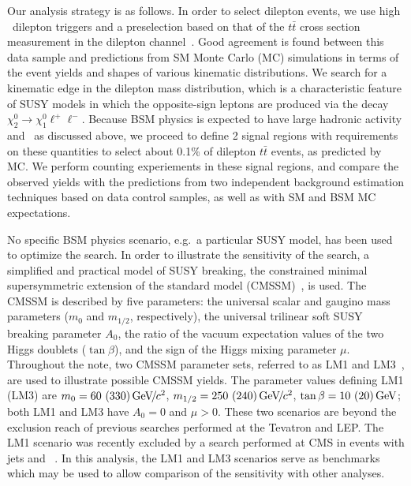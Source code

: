 Our analysis strategy is as follows. In order to select dilepton events, we
use high \pt\ dilepton triggers and a preselection based 
on that of the $t\bar{t}$ cross section measurement in the dilepton channel~\cite{ref:top}.
Good agreement is found between this
data sample and predictions from SM Monte Carlo (MC) simulations in terms of the event yields
and shapes of various kinematic distributions. 
We search for a kinematic edge in the dilepton mass distribution, which is a characteristic
feature of SUSY models in which the opposite-sign leptons are produced via the decay 
$\chi_2^0 \to \chi_1^0 \ell^+\ell^-$.
Because BSM physics is expected to have large hadronic activity and \MET\ as discussed
above, we  proceed to define 2 signal regions
with requirements on these quantities to select about 0.1\% 
of dilepton $t\bar{t}$ events, as predicted by MC.
We perform counting experiements in these signal regions, and compare the observed yields
with the predictions from two 
independent background estimation techniques based on data control samples, 
as well as with SM and BSM MC expectations.

No specific BSM physics scenario, e.g.\ a particular SUSY model, has been used to optimize the search.
In order to illustrate the sensitivity of the search, a simplified and practical model of 
SUSY breaking, the constrained minimal supersymmetric
extension of the standard model (CMSSM)~\cite{CMSSM,CMSSM2}, is used. The CMSSM is described by
five parameters: the universal scalar and gaugino mass parameters ($m_0$ and $m_{1/2}$, respectively),
the universal trilinear soft SUSY breaking parameter $A_0$, the
ratio of the vacuum expectation values of the two Higgs doublets ($\tan\beta$), and the sign of the
Higgs mixing parameter $\mu$. 
Throughout the note, two CMSSM parameter sets, referred
to as LM1 and LM3~\cite{TDR}, are used to illustrate possible CMSSM yields. The parameter values
defining LM1 (LM3) are $m_0 = 60~(330) {\,\text{Ge\hspace{-.08em}V\hspace{-0.16em}/\hspace{-0.08em}}c^\text{2}}$, $m_{1/2} = 250~(240) {\,\text{Ge\hspace{-.08em}V\hspace{-0.16em}/\hspace{-0.08em}}c^\text{2}}$, $\tan\beta = 10~(20)\,\text{Ge\hspace{-.08em}V}$; 
both LM1 and LM3 have $A_0 = 0$ and $\mu > 0$.  These two scenarios are beyond the exclusion reach 
of previous searches performed at the Tevatron and LEP. The LM1 scenario was recently excluded 
by a search performed at CMS in events with jets and \MET~\cite{ref:RA1}. 
In this analysis, the LM1 and LM3 scenarios serve as benchmarks which 
may be used to allow comparison of the sensitivity with other analyses.


